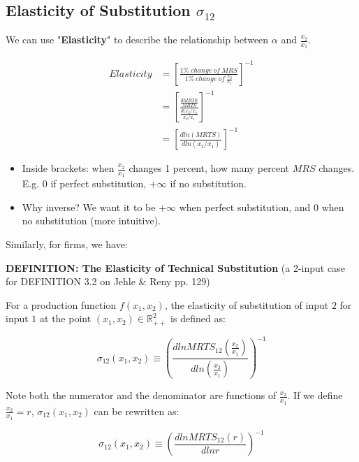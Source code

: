 \documentclass{article}
\newcommand{\R}{\mathbb{R}}
\begin{document}
\begin{mdframed}[backgroundcolor=blue!20,linecolor=white]

\section{Elasticity of Substitution $\sigma_{12}$}

We can use "\textbf{Elasticity}" to describe the relationship between $\alpha$ and $\frac{x_2}{x_1}$.

\begin{align*}
Elasticity &= [\frac{1\% \ change \  of \ MRS}{1\% \ change \ of \ \frac{x_2}{x_1}}]^{-1} \\
&= [\frac{\frac{d MRTS}{MRTS}}{\frac{d(x_2/x_1}{x_2/x_1}}]^{-1} \\
&= [\frac{d ln(MRTS)}{d ln(x_2/x_1)}]^{-1}
\end{align*}

\begin{itemize}
\item Inside brackets: when $\frac{x_2}{x_1}$ changes 1 percent, how many percent $MRS$ changes. E.g. $0$ if perfect substitution, $+\infty$ if no substitution.
\item Why inverse? We want it to be $+\infty$ when perfect substitution, and $0$ when no substitution (more intuitive).
\end{itemize}

Similarly, for firms, we have:

\textbf{DEFINITION: The Elasticity of Technical Substitution} (a 2-input case for DEFINITION 3.2 on Jehle \& Reny pp. 129)

\vspace{2mm}

For a production function $f(x_1,x_2)$, the elasticity of substitution of input $2$ for input $1$ at the
point $(x_1,x_2) \in \R^2_{++}$ is defined as:

$$\sigma_{12}(x_1,x_2) \equiv (\frac{d ln MRTS_{12}(\frac{x_2}{x_1})}{dln (\frac{x_2}{x_1})})^{-1}$$

Note both the numerator and the denominator are functions of $\frac{x_2}{x_1}$. If we define $\frac{x_2}{x_1} = r$,
$\sigma_{12}(x_1,x_2)$ can be rewritten as:

$$\sigma_{12}(x_1,x_2) \equiv (\frac{d ln MRTS_{12}(r)}{dln r})^{-1}$$

\end{mdframed}

\end{document}
